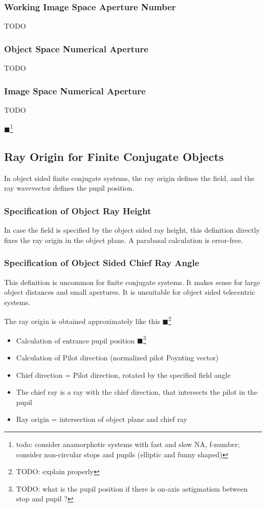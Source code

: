 \documentclass[12pt,a4paper,twoside,openright,BCOR10mm,headsepline,titlepage,abstracton,chapterprefix,final]{scrreprt}
\newcommand{\remark}[1]{{\color{red}$\blacksquare$}\footnote{{\color{red}#1}}}
\begin{document}
\subsubsection{Working Image Space Aperture Number}
TODO

\subsubsection{Object Space Numerical Aperture}
TODO

\subsubsection{Image Space Numerical Aperture}
TODO

\remark{todo: consider anamorphotic systems with fast and slow NA, f-number; consider non-circular stops and pupils (elliptic and funny shaped)}


\subsection{Ray Origin for Finite Conjugate Objects}
In object sided finite conjugate systems, the ray origin defines the field, and the ray wavevector defines the pupil position.

\subsubsection{Specification of Object Ray Height}
In case the field is specified by the object sided ray height,
this definition directly fixes the ray origin in the object plane.
A parabasal calculation is error-free.

\subsubsection{Specification of Object Sided Chief Ray Angle}
This definition is uncommon for finite conjugate systems. 
It makes sense for large object distances and small apertures.
It is unsuitable for object sided telecentric systems.

The ray origin is obtained approximately like this \remark{TODO: explain properly}
\begin{itemize}
 \item Calculation of entrance pupil position 
       \remark{TODO: what is the pupil position if there is on-axis astigmatism between stop and pupil ?}
 \item Calculation of Pilot direction (normalized pilot Poynting vector)
 \item Chief direction = Pilot direction, rotated by the specified field angle
 \item The chief ray is a ray with the chief direction, that intersects the pilot in the pupil
 \item Ray origin = intersection of object plane and chief ray
\end{itemize}
\end{document}
